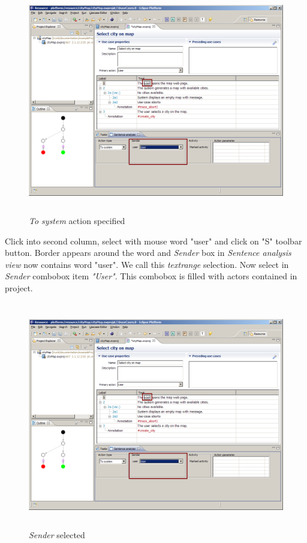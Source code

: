 \begin{figure}[ht]
  \centering
  \includegraphics[height=280pt]{images/manual-analysis/step1-action-selected}
  \caption{\emph{To system} action specified}
\end{figure}

Click into second column, select with mouse word "user" and click on "S" toolbar button. Border appears around the word and \emph{Sender} box in \emph{Sentence analysis view} now contains word "user". We call this \emph{textrange} selection. Now select in \emph{Sender} combobox item \emph{"User"}. This combobox is filled with actors contained in project.

\begin{figure}[ht]
  \centering
  \includegraphics[height=280pt]{images/manual-analysis/step1-sender-selected}
  \caption{\emph{Sender} selected}
\end{figure}

